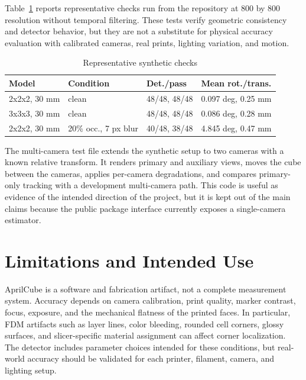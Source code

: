 \documentclass[conference]{IEEEtran}
\begin{document}
Table~\ref{tab:results} reports representative checks run from the repository at 800 by 800 resolution without temporal filtering. These tests verify geometric consistency and detector behavior, but they are not a substitute for physical accuracy evaluation with calibrated cameras, real prints, lighting variation, and motion.

\begin{table}[t]
\caption{Representative synthetic checks}
\label{tab:results}
\begin{center}
\begingroup
\scriptsize
\setlength{\tabcolsep}{2pt}
\begin{tabular}{|p{}|p{}|p{}|p{}|}
\hline
\textbf{Model} & \textbf{Condition} & \textbf{Det./pass} & \textbf{Mean rot./trans.} \\
\hline
2x2x2, 30 mm & clean & 48/48, 48/48 & 0.097 deg, 0.25 mm \\
\hline
3x3x3, 30 mm & clean & 48/48, 48/48 & 0.086 deg, 0.28 mm \\
\hline
2x2x2, 30 mm & 20\% occ., 7 px blur & 40/48, 38/48 & 4.845 deg, 0.47 mm \\
\hline
\end{tabular}
\endgroup
\end{center}
\end{table}

The multi-camera test file extends the synthetic setup to two cameras with a known relative transform. It renders primary and auxiliary views, moves the cube between the cameras, applies per-camera degradations, and compares primary-only tracking with a development multi-camera path. This code is useful as evidence of the intended direction of the project, but it is kept out of the main claims because the public package interface currently exposes a single-camera estimator.

\section{Limitations and Intended Use}
AprilCube is a software and fabrication artifact, not a complete measurement system. Accuracy depends on camera calibration, print quality, marker contrast, focus, exposure, and the mechanical flatness of the printed faces. In particular, FDM artifacts such as layer lines, color bleeding, rounded cell corners, glossy surfaces, and slicer-specific material assignment can affect corner localization. The detector includes parameter choices intended for these conditions, but real-world accuracy should be validated for each printer, filament, camera, and lighting setup.
\end{document}
